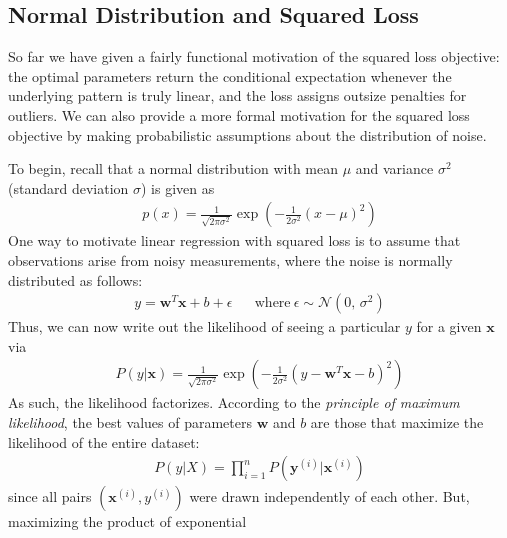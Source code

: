 \documentclass[a4paper,12pt]{article}
\theoremstyle{definition}
\begin{document}
\subsection*{Normal Distribution and Squared Loss}
So far we have given a fairly functional motivation of the squared loss objective: the optimal parameters return the conditional expectation
whenever the underlying pattern is truly linear, and the loss assigns outsize penalties for outliers. We can also provide a more formal motivation for the squared loss objective by making probabilistic assumptions about the distribution of noise.

To begin, recall that a normal distribution with mean $\mu$ and variance $\sigma^2$ (standard deviation $\sigma$) is given as
\begin{equation*}
    \begin{aligned}
        p(x) = \frac{1}{\sqrt{2\pi\sigma^2}}\exp({-\frac{1}{2\sigma^2}(x-\mu)^2})
    \end{aligned}
\end{equation*}
One way to motivate linear regression with squared loss is to assume that observations arise from noisy measurements, where the noise is normally distributed as follows:
\begin{equation*}
    \begin{aligned}
        y = \mathbf{w}^T\mathbf{x} + b + \epsilon &  & \textrm{where}\ \epsilon \sim \mathcal{N}(0,\,\sigma^{2})
    \end{aligned}
\end{equation*}
Thus, we can now write out the likelihood of seeing a particular $y$ for a given $\mathbf{x}$ via
\begin{equation*}
    \begin{aligned}
        P(y|\mathbf{x}) = \frac{1}{\sqrt{2\pi\sigma^2}}\exp({-\frac{1}{2\sigma^2}(y - \mathbf{w}^T\mathbf{x} - b)^2})
    \end{aligned}
\end{equation*}
As such, the likelihood factorizes. According to the \textit{principle of maximum likelihood}, the best values of parameters $\mathbf{w}$ and $b$
are those that maximize the likelihood of the entire dataset:
\begin{equation*}
    \begin{aligned}
        P(y|X) = \prod_{i=1}^{n}P(\mathbf{y}^{(i)}|\mathbf{x}^{(i)})
    \end{aligned}
\end{equation*}
since all pairs $(\mathbf{x}^{(i)},y^{(i)})$ were drawn independently of each other. But, maximizing the product of exponential
\end{document}
